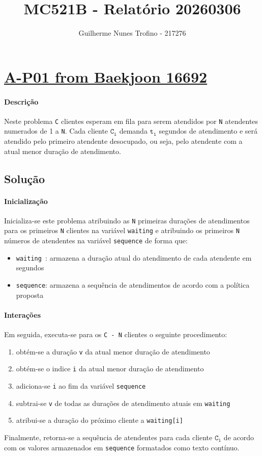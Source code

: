 \documentclass[a4paper]{article}
\author{Guilherme Nunes Trofino - 217276}
\title{MC521B - Relatório 20260306}
\begin{document}
\maketitle
\section{\href{https://vjudge.net/problem/Baekjoon-16692}{A-P01 from Baekjoon 16692}}
\paragraph{Descrição} Neste problema \texttt{C} clientes esperam em fila para serem atendidos por \texttt{N} atendentes numerados de 1 a \texttt{N}. Cada cliente $\texttt{C}_\texttt{i}$ demanda $\texttt{t}_\texttt{i}$ segundos de atendimento e será atendido pelo primeiro atendente desocupado, ou seja, pelo atendente com a atual menor duração de atendimento.

\subsection{Solução}

\paragraph{Inicialização} Inicializa-se este problema atribuindo as \texttt{N} primeiras durações de atendimentos para os primeiros \texttt{N} clientes na variável \texttt{waiting} e atribuindo os primeiros \texttt{N} números de atendentes na variável \texttt{sequence} de forma que:
\begin{itemize}
    \item \texttt{waiting }: armazena a duração atual do atendimento de cada atendente em segundos
    \item \texttt{sequence}: armazena a sequência de atendimentos de acordo com a política proposta
\end{itemize}

\paragraph{Interações} Em seguida, executa-se para os \texttt{C - N} clientes o seguinte procedimento:
\begin{enumerate}
    \item obtém-se a duração \texttt{v} da atual menor duração de atendimento
    \item obtém-se o indice \texttt{i} da atual menor duração de atendimento
    \item adiciona-se \texttt{i} ao fim da variável \texttt{sequence}
    \item subtrai-se \texttt{v} de todas as durações de atendimento atuais em \texttt{waiting}
    \item atribui-se a duração do próximo cliente a \texttt{waiting[i]}
\end{enumerate}
Finalmente, retorna-se a sequência de atendentes para cada cliente $\texttt{C}_\texttt{i}$ de acordo com os valores armazenados em \texttt{sequence} formatados como texto contínuo.
\end{document}
